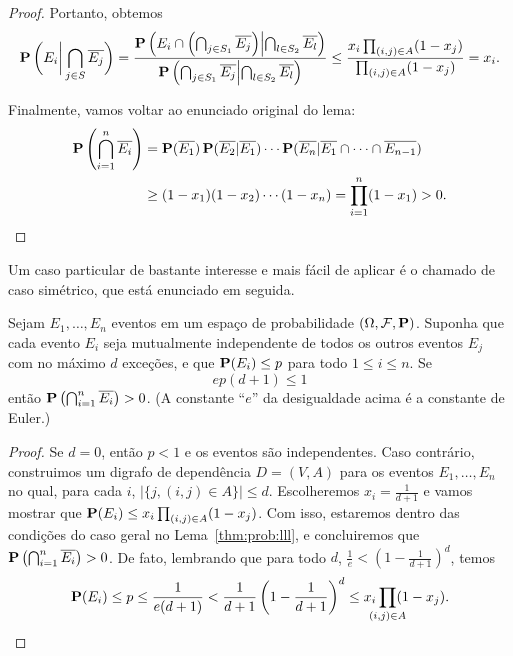 \begin{proof}
Portanto, obtemos
\begin{align*}
  \operatorname{\mathbf{P}}\bigg( E_i \bigg| \bigcap_{j \in S} \overline{E_j} \bigg) = \frac{\operatorname{\mathbf{P}}\left( E_i \cap \left(\bigcap_{j \in S_1} \overline{E_j} \right) \middle| \bigcap_{l \in S_2} \overline{E_l} \right)}{\operatorname{\mathbf{P}}\left( \bigcap_{j \in S_1} \overline{E_j} \middle| \bigcap_{l \in S_2} \overline{E_l} \right)} \leq \frac{x_i\prod_{(i,j) \in A}(1-x_j)}{\prod_{(i,j) \in A}(1-x_j)} = x_i.
\end{align*}

Finalmente, vamos voltar ao enunciado original do lema:
\begin{align*}
\operatorname{\mathbf{P}} \left( \bigcap_{i = 1}^n \overline{E_i} \right) &= \operatorname{\mathbf{P}} (\overline{E_1}) \operatorname{\mathbf{P}} (\overline{E_2} | \overline{E_1} ) \cdots \operatorname{\mathbf{P}}( \overline{E_n} | \overline{E_1} \cap \dots \cap \overline{E_{n-1}}) \\
&\geq (1 - x_1)(1 - x_2)\cdots(1-x_n) = \prod_{i=1}^n(1 - x_1) > 0. \qedhere
\end{align*}
\end{proof}

Um caso particular de bastante interesse e mais fácil de aplicar é o chamado de caso simétrico, que está enunciado em seguida.

\begin{lemma}
\label{thm:prob:llls}
Sejam $E_1, \dots, E_n$ eventos em um espaço de probabilidade $(\Omega, \mathcal{F}, \operatorname{\mathbf{P}})$. Suponha que cada evento $E_i$ seja mutualmente independente de todos os outros eventos $E_j$ com no máximo $d$ exceções, e que $\operatorname{\mathbf{P}}(E_i) \leq p$ para todo $1 \leq i \leq n$. Se
\[ ep(d+1) \leq 1 \]
então $\operatorname{\mathbf{P}} \left( \bigcap_{i = 1}^n \overline{E_i} \right) > 0$. (A constante ``$e$'' da desigualdade acima é a constante de Euler.)
\end{lemma}
\begin{proof}
Se $d = 0$, então $p < 1$ e os eventos são independentes. Caso contrário, construimos um digrafo de dependência $D = (V,A)$ para os eventos $E_1, \dots, E_n$ no qual, para cada $i$, $|\{j, (i,j) \in A\}| \leq d$. Escolheremos $x_i = \frac{1}{d+1}$ e vamos mostrar que $\operatorname{\mathbf{P}} (E_i) \leq x_i \prod_{(i,j) \in A}(1-x_j)$.
Com isso, estaremos dentro das condições do caso geral no Lema~\ref{thm:prob:lll}, e concluiremos que $\operatorname{\mathbf{P}} \left( \bigcap_{i = 1}^n \overline{E_i} \right) > 0$. De fato, lembrando que para todo $d$, $\frac{1}{e} < (1 - \frac{1}{d+1})^d$, temos
\[ \prob(E_i) \leq p \leq \frac{1}{e(d+1)} < \frac{1}{d+1}\left(1 - \frac{1}{d+1} \right)^d \leq x_i \prod_{\mathclap{(i,j) \in A}}(1-x_j). \qedhere\]
\end{proof}

